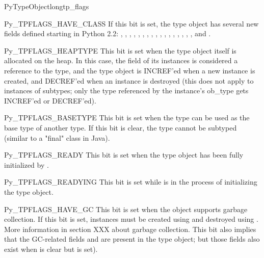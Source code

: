\begin{cmemberdesc}{PyTypeObject}{long}{tp_flags}
  \begin{datadesc}{Py_TPFLAGS_HAVE_CLASS}
    If this bit is set, the type object has several new fields defined
    starting in Python 2.2: , ,
    , , ,
    , ,
    , , ,
    , , ,
    , , ,
    , and .
  \end{datadesc}

  \begin{datadesc}{Py_TPFLAGS_HEAPTYPE}
    This bit is set when the type object itself is allocated on the
    heap.  In this case, the  field of its instances
    is considered a reference to the type, and the type object is
    INCREF'ed when a new instance is created, and DECREF'ed when an
    instance is destroyed (this does not apply to instances of
    subtypes; only the type referenced by the instance's ob_type gets
    INCREF'ed or DECREF'ed).
  \end{datadesc}

  \begin{datadesc}{Py_TPFLAGS_BASETYPE}
    This bit is set when the type can be used as the base type of
    another type.  If this bit is clear, the type cannot be subtyped
    (similar to a "final" class in Java).
  \end{datadesc}

  \begin{datadesc}{Py_TPFLAGS_READY}
    This bit is set when the type object has been fully initialized by
    .
  \end{datadesc}

  \begin{datadesc}{Py_TPFLAGS_READYING}
    This bit is set while  is in the process
    of initializing the type object.
  \end{datadesc}

  \begin{datadesc}{Py_TPFLAGS_HAVE_GC}
    This bit is set when the object supports garbage collection.  If
    this bit is set, instances must be created using
     and destroyed using
    .  More information in section XXX
    about garbage collection.  This bit also implies that the
    GC-related fields  and  are
    present in the type object; but those fields also exist when
     is clear but
     is set).
  \end{datadesc}


\end{cmemberdesc}
